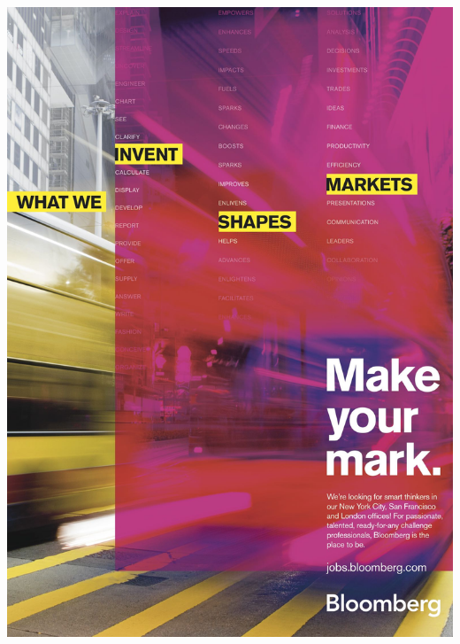 \begin{center}
\includegraphics[width=1\textwidth]{content/images-web/ads/bloomberg}
\par\end{center}

